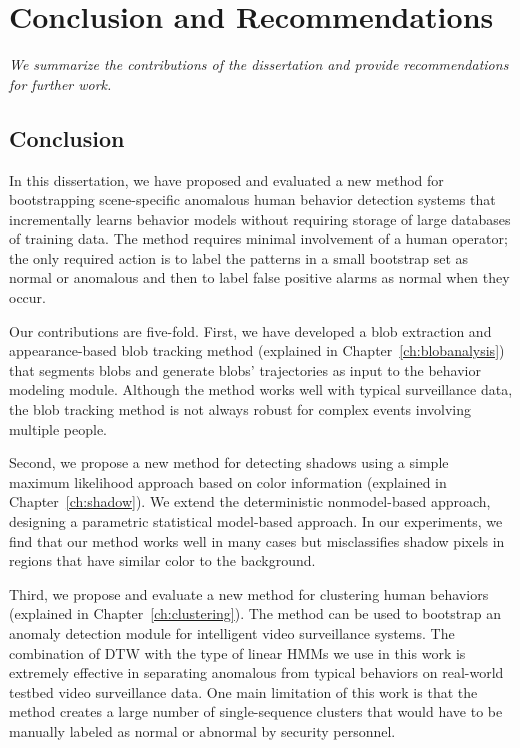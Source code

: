 \setlength{\footskip}{8mm}

\chapter{Conclusion and Recommendations}
\label{ch:conclusion}

\textit{We summarize the contributions of the dissertation and
provide recommendations for further work.}

\section{Conclusion}

In this dissertation, we have proposed and evaluated a new method for
bootstrapping scene-specific anomalous human behavior detection systems that
incrementally learns behavior models without requiring storage of large
databases of training data. The method requires minimal involvement of a human
operator; the only required action is to label the patterns in a small
bootstrap set as normal or anomalous and then to label false positive alarms as
normal when they occur.

Our contributions are five-fold. First, we have developed a blob extraction and
appearance-based blob tracking method (explained in
Chapter~\ref{ch:blobanalysis}) that segments blobs and generate blobs'
trajectories as input to the behavior modeling module. Although the method
works well with typical surveillance data, the blob tracking method is not
always robust for complex events involving multiple people. 

Second, we propose a new method for detecting shadows using a simple maximum
likelihood approach based on color information (explained in
Chapter~\ref{ch:shadow}). We extend the deterministic nonmodel-based approach,
designing a parametric statistical model-based approach.  In our experiments,
we find that our method works well in many cases but misclassifies shadow
pixels in regions that have similar color to the background.  

Third, we propose and evaluate a new method for clustering human behaviors
(explained in Chapter~\ref{ch:clustering}). The method can be used to bootstrap
an anomaly detection module for intelligent video surveillance systems. The
combination of DTW with the type of linear HMMs we use in this work is
extremely effective in separating anomalous from typical behaviors on
real-world testbed video surveillance data. One main limitation of this work is
that the method creates a large number of single-sequence clusters that would
have to be manually labeled as normal or abnormal by security personnel.

